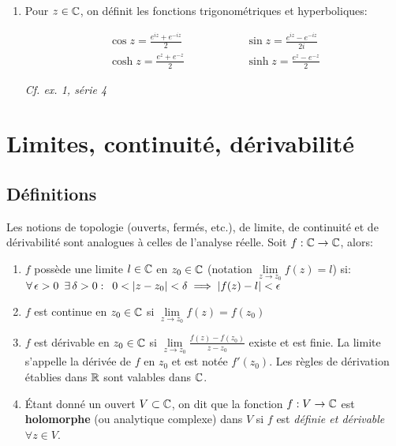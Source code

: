 \begin{example}
\begin{enumerate}[label=\arabic{enumi})]
    \item 
    Pour $z \in \mathbb{C}$, on définit les fonctions trigonométriques et hyperboliques:
    
    \begin{align*}
    \cos z = \frac{e^{iz} + e^{-iz}}{2}
    &\hspace{2cm} \sin z = \frac{e^{iz} - e^{-iz}}{2i}\\
    \cosh z = \frac{e^{z} + e^{-z}}{2}
    &\hspace{2cm} \sinh z = \frac{e^{z} - e^{-z}}{2}
    \end{align*}
    
    \textit{Cf. ex. 1, série 4}
\end{enumerate}
\end{example}


\section{Limites, continuité, dérivabilité}

\subsection{Définitions}

\begin{definition}[9.1, p.67]
    Les notions de topologie (ouverts, fermés, etc.), de limite, de continuité et de dérivabilité sont analogues à celles de l'analyse réelle.
    Soit $f: \mathbb{C} \rightarrow \mathbb{C}$, alors:
    
    \begin{enumerate}[label=\arabic{enumi})]
    \item 
    $f$ possède une limite $l \in \mathbb{C}$ en $z_0 \in \mathbb{C}$ (notation $\lim\limits_{z \rightarrow z_0} f(z) = l$) si:\\
    $\forall\, \epsilon > 0 \enspace \exists\, \delta > 0 :\enspace 0 < \left|z - z_0\right| < \delta \implies \left|f(z) - l\right| < \epsilon$
    
    \item 
    $f$ est continue en $z_0 \in \mathbb{C}$ si $\lim\limits_{z \rightarrow z_0} f(z) = f(z_0)$
    
    \item 
    $f$ est dérivable en $z_0 \in \mathbb{C}$ si $\lim\limits_{z \rightarrow z_0} \frac{f(z) - f(z_0)}{z - z_0}$ existe et est finie.
    La limite s'appelle la dérivée de $f$ en $z_0$ et est notée $f'(z_0)$.
    Les règles de dérivation établies dans $\mathbb{R}$ sont valables dans $\mathbb{C}$.
    
    \item 
    Étant donné un ouvert $V \subset \mathbb{C}$, on dit que la fonction $f: V \rightarrow \mathbb{C}$ est \textbf{holomorphe} (ou analytique complexe) dans $V$ si $f$ est \textit{définie et dérivable} $\forall z \in V$.
    \end{enumerate}
\end{definition}

